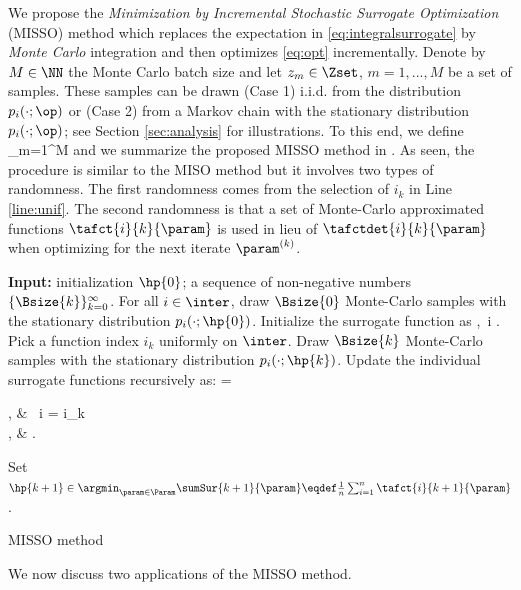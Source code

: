 \documentclass[11pt]{article}
\theoremstyle{t}
\begin{document}
We propose the \emph{Minimization by Incremental Stochastic Surrogate Optimization} (MISSO) method  which replaces the expectation in \eqref{eq:integralsurrogate} by \emph{Monte Carlo} integration and then optimizes \eqref{eq:opt} incrementally.
Denote by $M \in \NN$ the Monte Carlo batch size and let $z_m \in \Zset$, $m=1,...,M$ be a set of samples. These samples can be drawn
{\sf (Case 1)} i.i.d. from the distribution $p_i( \cdot ; \op )$ or {\sf (Case 2)}  from a Markov chain with the stationary distribution $p_{i}(\cdot; \op)$; see Section \ref{sec:analysis} for illustrations.
To this end, we define
\beq \label{eq:ssur}  
 \eqdef {} \sum_{m=1}^{M} 
\eeq
and we summarize the proposed MISSO method in .
As seen, the procedure is similar to the MISO method but it involves two types of randomness. The first randomness comes from the selection of $i_k$ in Line \ref{line:unif}. The second randomness is that a set of Monte-Carlo approximated functions $\tafct{i}{k}{\param}$ is used in lieu of $\tafctdet{i}{k}{\param}$ when optimizing for the next iterate $\param^{(k)}$.
\begin{algorithm}[t]
\begin{algorithmic}[1]
\STATE \textbf{Input:} initialization $\hp{0}$; a sequence of non-negative numbers $\{ \Bsize{k} \}_{k=0}^\infty$.
\STATE For all $i \in \inter$, draw $\Bsize{0}$ Monte-Carlo samples with the stationary distribution $p_i(\cdot; \hp{0})$.
\STATE Initialize the surrogate function as
\beq
{} \eqdef {},~i \in \inter \eqsp. \vspace{-.2cm}
\eeq
{}
\STATE \label{line:unif}Pick a function index $i_k$ uniformly on $\inter$.
\STATE Draw $\Bsize{k}$ Monte-Carlo samples with the stationary distribution $p_i(\cdot; \hp{k})$.
\STATE \label{line:ssur} Update the individual surrogate functions recursively as:
\beq
{} = \begin{cases}
, & ~i = i_k \\
, & .
\end{cases}
\eeq
\STATE \label{line:iter} Set $\hp{k+1} \in \argmin_{ \param \in \Param } \sumSur{k+1}{\param} \eqdef  \frac{1}{n} \sum_{i=1}^n \tafct{i}{k+1}{\param}$.
\ENDFOR
\end{algorithmic}
\caption{MISSO method}
\label{alg:misso}
        \end{algorithm}
We now discuss two applications of the MISSO method.
\end{document}
